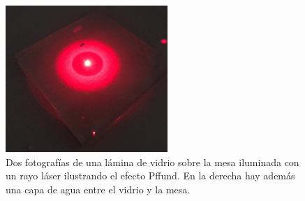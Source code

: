 \documentclass[12pt]{article}
\numberwithin{table}{section}
\numberwithin{figure}{section}
\numberwithin{equation}{section}
\begin{document}
\begin{figure}[!ht]
	\small \centering \sffamily
	\begin{center}
		\includegraphics[width=6.15cm]{P2PffAgrio.jpeg}
		\caption{Dos fotografías de una lámina de vidrio sobre la mesa iluminada con un rayo láser ilustrando el efecto Pffund. En la derecha hay además una capa de agua entre el vidrio y la mesa.}
		\label{P2PffFotoAgrio}
	\end{center}
\end{figure}
\end{document}
